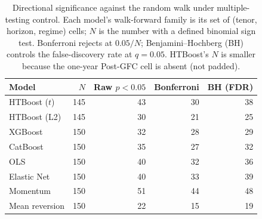 \begin{table}[htbp]
\centering
\caption{Directional significance against the random walk under multiple-testing control. Each model's walk-forward family is its set of (tenor, horizon, regime) cells; $N$ is the number with a defined binomial sign test. Bonferroni rejects at $0.05/N$; Benjamini--Hochberg (BH) controls the false-discovery rate at $q=0.05$. HTBoost's $N$ is smaller because the one-year Post-GFC cell is absent (not padded).}
\label{tab:oos_survivors}
\begin{tabular}{lrrrr}
\toprule
Model & $N$ & Raw $p<0.05$ & Bonferroni & BH (FDR) \\
\midrule
HTBoost ($t$) & 145 & 43 & 30 & 38 \\
HTBoost (L2) & 145 & 30 & 21 & 25 \\
XGBoost & 150 & 32 & 28 & 29 \\
CatBoost & 150 & 35 & 27 & 32 \\
OLS & 150 & 40 & 32 & 36 \\
Elastic Net & 150 & 40 & 33 & 39 \\
Momentum & 150 & 51 & 44 & 48 \\
Mean reversion & 150 & 22 & 15 & 19 \\
\bottomrule
\end{tabular}
\end{table}
